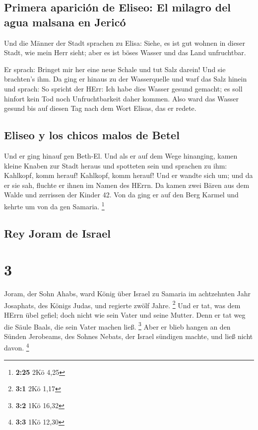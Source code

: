 \hypertarget{primera-apariciuxf3n-de-eliseo-el-milagro-del-agua-malsana-en-jericuxf3}{%
\subsection{Primera aparición de Eliseo: El milagro del agua malsana en
Jericó}\label{primera-apariciuxf3n-de-eliseo-el-milagro-del-agua-malsana-en-jericuxf3}}

 Und die Männer der Stadt sprachen zu Elisa: Siehe, es
ist gut wohnen in dieser Stadt, wie mein Herr sieht; aber es ist böses
Wasser und das Land unfruchtbar.

 Er sprach: Bringet mir her eine neue Schale und tut Salz
darein! Und sie brachten's ihm.  Da ging er hinaus zu der
Wasserquelle und warf das Salz hinein und sprach: So spricht der HErr:
Ich habe dies Wasser gesund gemacht; es soll hinfort kein Tod noch
Unfruchtbarkeit daher kommen.  Also ward das Wasser
gesund bis auf diesen Tag nach dem Wort Elisas, das er redete.

\hypertarget{eliseo-y-los-chicos-malos-de-betel}{%
\subsection{Eliseo y los chicos malos de
Betel}\label{eliseo-y-los-chicos-malos-de-betel}}

 Und er ging hinauf gen Beth-El. Und als er auf dem Wege
hinanging, kamen kleine Knaben zur Stadt heraus und spotteten sein und
sprachen zu ihm: Kahlkopf, komm herauf! Kahlkopf, komm herauf!
 Und er wandte sich um; und da er sie sah, fluchte er
ihnen im Namen des HErrn. Da kamen zwei Bären aus dem Walde und
zerrissen der Kinder 42.  Von da ging er auf den Berg
Karmel und kehrte um von da gen Samaria. \footnote{\textbf{2:25} 2Kö
  4,25}

\hypertarget{rey-joram-de-israel}{%
\subsection{Rey Joram de Israel}\label{rey-joram-de-israel}}

\hypertarget{section-2}{%
\section{3}\label{section-2}}

 Joram, der Sohn Ahabs, ward König über Israel zu Samaria
im achtzehnten Jahr Josaphats, des Königs Judas, und regierte zwölf
Jahre. \footnote{\textbf{3:1} 2Kö 1,17}  Und er tat, was
dem HErrn übel gefiel; doch nicht wie sein Vater und seine Mutter. Denn
er tat weg die Säule Baals, die sein Vater machen ließ. \footnote{\textbf{3:2}
  1Kö 16,32}  Aber er blieb hangen an den Sünden
Jerobeams, des Sohnes Nebats, der Israel sündigen machte, und ließ nicht
davon. \footnote{\textbf{3:3} 1Kö 12,30}

